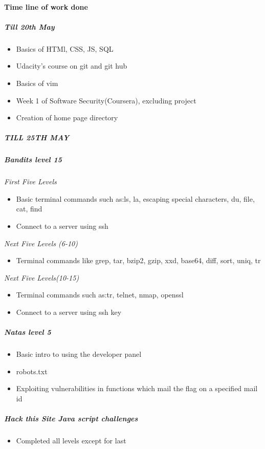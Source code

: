 \documentclass{article}
\begin{document}
\paragraph{Time line of work done}
\subparagraph{\textit{Till 20th May}}
    \begin{itemize}
        \item Basics of HTMl, CSS, JS, SQL 
        \item Udacity's course on git and git hub 
        \item Basics of vim 
        \item Week 1 of Software Security(Coursera), excluding project 
        \item Creation of home page directory
    \end{itemize}
\subparagraph{\textit{TILL 25TH MAY}}
\subparagraph{Bandits level 15}
    \textit{First Five Levels}
    \begin{itemize}
        \item Basic terminal commands such as:ls, la, escaping special characters, du, file, cat, find
        \item Connect to a server using ssh
    \end{itemize}
    \textit{Next Five Levels (6-10)}
    \begin{itemize}
        \item Terminal commands like grep, tar, bzip2, gzip, xxd, base64, diff, sort, uniq, tr
    \end{itemize}
    \textit{Next Five Levels(10-15)}
    \begin{itemize}
        \item Terminal commands such as:tr, telnet, nmap, openssl
        \item Connect to a server using ssh key
    \end{itemize}
\subparagraph{Natas level 5}
    \begin{itemize}
        \item Basic intro to using the developer panel
        \item robots.txt
        \item Exploiting vulnerabilities in functions which mail the flag on a specified mail id
    \end{itemize}    
\subparagraph{Hack this Site Java script challenges}
    \begin{itemize}
        \item Completed all levels except for last
    \end{itemize}    
\end{document}
